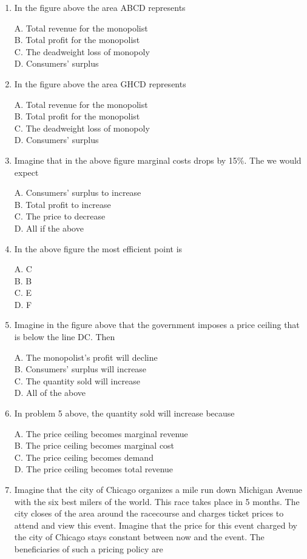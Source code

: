 \documentclass[
]{book}
\begin{document}
\begin{enumerate}
\def\labelenumi{\arabic{enumi}.}
\item
  In the figure above the area ABCD represents

  A. Total revenue for the monopolist\\
  B. Total profit for the monopolist\\
  C. The deadweight loss of monopoly\\
  D. Consumers' surplus
\item
  In the figure above the area GHCD represents

  A. Total revenue for the monopolist\\
  B. Total profit for the monopolist\\
  C. The deadweight loss of monopoly\\
  D. Consumers' surplus
\item
  Imagine that in the above figure marginal costs drops by 15\%. The we would expect

  A. Consumers' surplus to increase\\
  B. Total profit to increase\\
  C. The price to decrease\\
  D. All if the above
\item
  In the above figure the most efficient point is

  A. C\\
  B. B\\
  C. E\\
  D. F
\item
  Imagine in the figure above that the government imposes a price ceiling that is below the line DC. Then

  A. The monopolist's profit will decline\\
  B. Consumers' surplus will increase\\
  C. The quantity sold will increase\\
  D. All of the above
\item
  In problem 5 above, the quantity sold will increase because

  A. The price ceiling becomes marginal revenue\\
  B. The price ceiling becomes marginal cost\\
  C. The price ceiling becomes demand\\
  D. The price ceiling becomes total revenue
\item
  Imagine that the city of Chicago organizes a mile run down Michigan Avenue with the six best milers of the world. This race takes place in 5 months. The city closes of the area around the racecourse and charges ticket prices to attend and view this event. Imagine that the price for this event charged by the city of Chicago stays constant between now and the event. The beneficiaries of such a pricing policy are


\end{enumerate}
\end{document}

